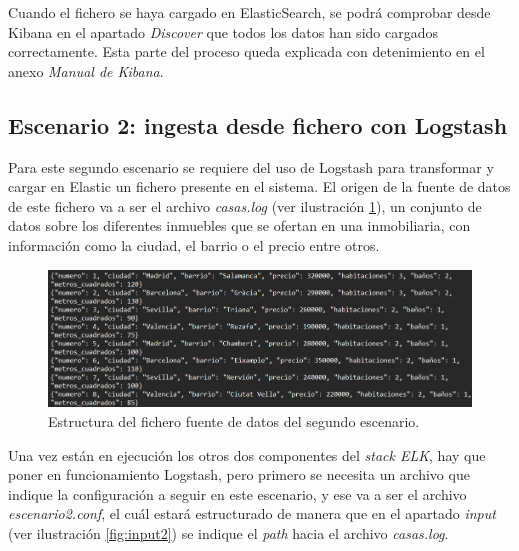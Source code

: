 Cuando el fichero se haya cargado en ElasticSearch, se podrá comprobar desde Kibana en el apartado \textit{Discover} que todos los datos han sido cargados correctamente. Esta parte del proceso queda explicada con detenimiento en el anexo \textit{Manual de Kibana}.

\paragraph{}
\paragraph{}
\paragraph{}
\paragraph{}


\subsection{Escenario 2: ingesta desde fichero con Logstash}
Para este segundo escenario se requiere del uso de Logstash para transformar y cargar en Elastic un fichero presente en el sistema. El origen de la fuente de datos de este fichero va a ser el archivo \textit{casas.log} (ver ilustración  \ref{fig:casas}), un conjunto de datos sobre los diferentes inmuebles que se ofertan en una inmobiliaria, con información como la ciudad, el barrio o el precio entre otros.
\begin{figure}
    \centering
    \includegraphics[width=1\linewidth]{img/casas.png}
    \caption{Estructura del fichero fuente de datos del segundo escenario.}
    \label{fig:casas}
\end{figure}

Una vez están en ejecución los otros dos componentes del \textit{stack ELK}, hay que poner en funcionamiento Logstash, pero primero se necesita un archivo que indique la configuración a seguir en este escenario, y ese va a ser el archivo \textit{escenario2.conf}, el cuál estará estructurado de manera que en el apartado \textit{input}  (ver ilustración  \ref{fig:input2}) se indique el \textit{path} hacia el archivo \textit{casas.log}.

